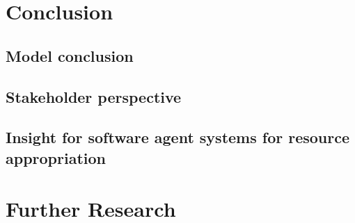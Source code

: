 \documentclass[a4paper]{article}
\begin{document}

\clearpage

\section{Conclusion}
\subsection{Model conclusion}
\subsection{Stakeholder perspective}
\subsection{Insight for software agent systems for resource appropriation}
\section{Further Research}
\end{document}
